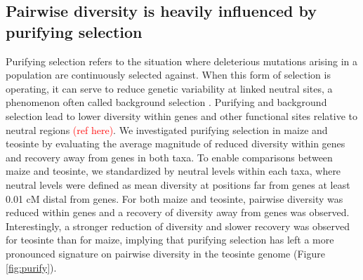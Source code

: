 \documentclass{pnastwo}
\newcommand{\jri}[1]{\textcolor{blue}{\emph{#1}} }
\begin{document}
\begin{article}
\subsection{Pairwise diversity is heavily influenced by purifying selection}
Purifying selection refers to the situation where deleterious mutations arising in a population are continuously selected against.
When this form of selection is operating, it can serve to reduce genetic variability at linked neutral sites, a phenomenon often called background selection \cite{charlesworth1993}. Purifying and background selection lead to lower diversity within genes and other functional sites relative to neutral regions \textcolor{red}{(ref here)}.
We investigated purifying selection in maize and teosinte by evaluating the average magnitude of reduced diversity within genes and recovery away from genes in both taxa.
To enable comparisons between maize and teosinte, we standardized by neutral levels within each taxa, where neutral levels were defined as mean diversity at positions far from genes at least 0.01 cM distal from genes. For both maize and teosinte, pairwise diversity was reduced within genes and a recovery of diversity away from genes was observed. Interestingly, a stronger reduction of diversity and slower recovery was observed for teosinte than for maize, implying that purifying selection has left a more pronounced signature on pairwise diversity in the teosinte genome (Figure \ref{fig:purify}).




\end{article}
\end{document}
